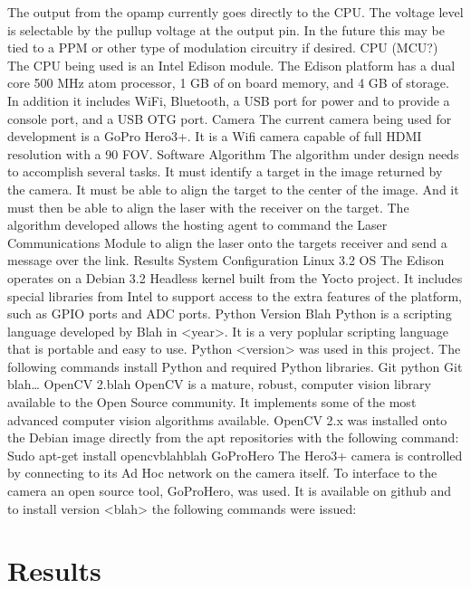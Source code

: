 \documentclass[botnum, fleqn]{unmeethesis}
\begin{document}
The output from the opamp currently goes directly to the CPU. The voltage level is selectable by the pullup voltage at the output pin. In the future this may be tied to a PPM or other type of modulation circuitry if desired. 
CPU (MCU?)
The CPU being used is an Intel Edison module. The Edison platform has a dual core 500 MHz atom processor, 1 GB of on board memory, and 4 GB of storage. In addition it includes WiFi, Bluetooth, a USB port for power and to provide a console port, and a USB OTG port. 
Camera
The current camera being used for development is a GoPro Hero3+. It is a Wifi camera capable of full HDMI resolution with a 90 FOV. 
Software
Algorithm
The algorithm under design needs to accomplish several tasks. It must identify a target in the image returned by the camera. It must be able to align the target to the center of the image. And it must then be able to align the laser with the receiver on the target. The algorithm developed allows the hosting agent to command the Laser Communications Module to align the laser onto the targets receiver and send a message over the link.
Results
System Configuration
Linux 3.2 OS
The Edison operates on a Debian 3.2 Headless kernel built from the Yocto project. It includes special libraries from Intel to support access to the extra features of the platform, such as GPIO ports and ADC ports. 
Python Version Blah
Python is a scripting language developed by Blah in <year>. It is a very poplular scripting language that is portable and easy to use. Python <version> was used in this project. The following commands install Python and required Python libraries.
Git python
Git blah…
OpenCV 2.blah
OpenCV is a mature, robust, computer vision library available to the Open Source community. It implements some of the most advanced computer vision algorithms available. OpenCV 2.x was installed onto the Debian image directly from the apt repositories with the following command:
Sudo apt-get install opencvblahblah
GoProHero 
The Hero3+ camera is controlled by connecting to its Ad Hoc network on the camera itself. To interface to the camera an open source tool, GoProHero, was used. It is available on github and to install version <blah> the following commands were issued:


\section*{Results}
\end{document}
